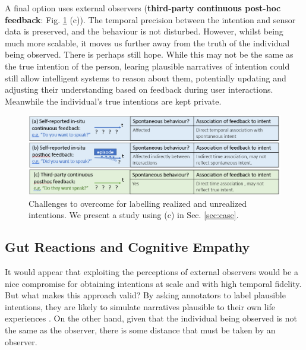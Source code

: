 \documentclass[manuscript,screen,review]{acmart}
\begin{document}
A final option uses external observers (\textbf{third-party continuous post-hoc feedback}: Fig. \ref{fig:selfvsthird} (c)). The temporal precision between the intention and sensor data is preserved, and the behaviour is not disturbed. However, whilst being much more scalable, it moves us further away from the truth of the individual being observed. There is perhaps still hope. While this may not be the same as the true intention of the person, learing plausible narratives of intention could still allow intelligent systems to reason about them, potentially updating and adjusting their understanding based on feedback during user interactions. Meanwhile the individual's true intentions are kept private. 



\begin{figure}[tb]
    \includegraphics[width=\columnwidth]{samples/SelfvsThirdPartyIntentAnnotations_v3.png}
        \vspace{-5mm}
    \caption{Challenges to overcome for labelling realized and unrealized intentions. We present a study using (c) in Sec. \ref{sec:case}.}
        \vspace{-5mm}
    \label{fig:selfvsthird}
\end{figure}

\subsection{Gut Reactions and Cognitive Empathy}
It would appear that exploiting the perceptions of external observers would be a nice compromise for obtaining intentions at scale and with high temporal fidelity. But what makes this approach valid? By asking annotators to label plausible intentions, they are likely to simulate narratives plausible to their own life experiences \cite{Decety2004,barrett2017emotions,Ridderinkhof2022}. On the other hand, given that the individual being observed is not the same as the observer, there is some distance that must be taken by an observer. 
\end{document}

